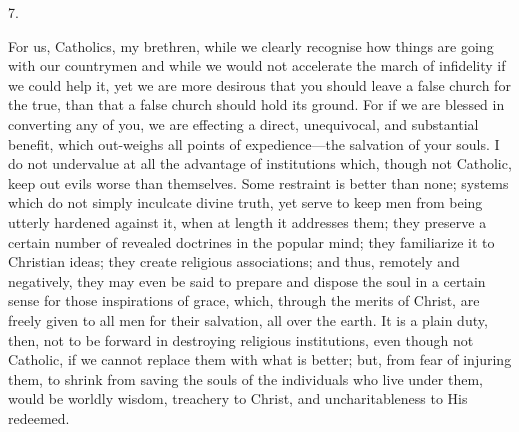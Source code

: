 7.

For us, Catholics, my brethren, while we clearly recognise how
things are going with our countrymen and while we would not accelerate
the march of infidelity if we could help it, yet we are more desirous
that you should leave a false church for the true, than that a false
church should hold its ground. For if we are blessed in converting any
of you, we are effecting a direct, unequivocal, and substantial
benefit, which out-weighs all points of expedience—the salvation of
your souls. I do not undervalue at all the advantage of institutions
which, though not Catholic, keep out evils worse than themselves. Some
restraint is better than none; systems which do not simply inculcate
divine truth, yet serve to keep men from being utterly hardened
against it, when at length it addresses them; they preserve a certain
number of revealed doctrines in the popular mind; they familiarize it
to Christian ideas; they create religious associations; and thus,
remotely and negatively, they may even be said to prepare and dispose
the soul in a certain sense for those inspirations of grace, which,
through the merits of Christ, are freely given to all men for their
salvation, all over the earth. It is a plain duty, then, not to be
forward in destroying religious institutions, even though not
Catholic, if we cannot replace them with what is better; but, from
fear of injuring them, to shrink from saving the souls of the
individuals who live under them, would be worldly wisdom, treachery to
Christ, and uncharitableness to His redeemed.

